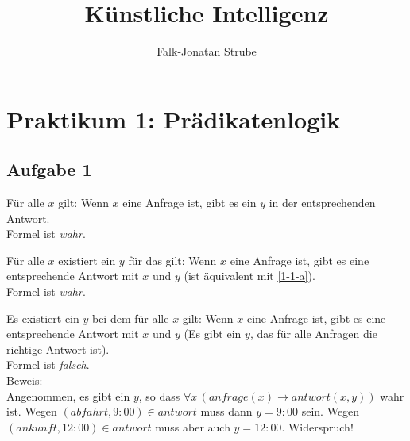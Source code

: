 \documentclass{scrreprt}
\title{Künstliche Intelligenz}
\author{Falk-Jonatan Strube}
\begin{document}
\maketitle
\tableofcontents

\chapter{Praktikum 1: Prädikatenlogik}

\section{Aufgabe 1}
\begin{anumerate}
\item\label{1-1-a} Für alle $x$ gilt: Wenn $x$ eine Anfrage ist, gibt es ein $y$ in der entsprechenden Antwort.\\
Formel ist \emph{wahr}.
\item Für alle $x$ existiert ein $y$ für das gilt: Wenn $x$ eine Anfrage ist, gibt es eine entsprechende Antwort mit $x$ und $y$ (ist äquivalent mit \ref{1-1-a}).\\
Formel ist \emph{wahr}.
\item Es existiert ein $y$ bei dem für alle $x$ gilt: Wenn $x$ eine Anfrage ist, gibt es eine entsprechende Antwort mit $x$ und $y$ (Es gibt ein $y$, das für alle Anfragen die richtige Antwort ist).\\
Formel ist \emph{falsch}.\\
Beweis:\\
Angenommen, es gibt ein $y$, so dass $\forall x\,(anfrage(x) \to antwort(x,y))$ wahr ist. Wegen $(abfahrt, 9:00) \in antwort$ muss dann $y=9:00$ sein. Wegen $(ankunft, 12:00)\in antwort$ muss aber auch $y=12:00$. Widerspruch!
\end{anumerate}
\end{document}
